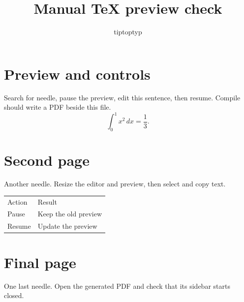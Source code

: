 \documentclass{article}
\begin{document}
\title{Manual TeX preview check}
\author{tiptoptyp}
\maketitle
\tableofcontents
\section{Preview and controls}
Search for needle, pause the preview, edit this sentence, then resume.
Compile should write a PDF beside this file.
\[
  \int_0^1 x^2\,dx = \frac{1}{3}.
\]
\newpage
\section{Second page}
Another needle. Resize the editor and preview, then select and copy text.
\begin{tabular}{ll}
Action & Result \\
Pause & Keep the old preview \\
Resume & Update the preview
\end{tabular}
\newpage
\section{Final page}
One last needle. Open the generated PDF and check that its sidebar starts closed.
\end{document}
